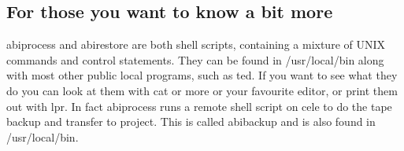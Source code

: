 \subsection{For those you want to know a bit more}

{\sf abiprocess} and {\sf abirestore} are both shell scripts,
containing a mixture of UNIX commands and control statements.  They
can be found in {\sf /usr/local/bin} along with most other public
local programs, such as {\sf ted}.  If you want to see what they do
you can look at them with {\sf cat} or {\sf more} or your favourite
editor, or print them out with {\sf lpr}.  In fact {\sf abiprocess}
runs a remote shell script on cele to do the tape backup and transfer
to project.  This is called {\sf abibackup} and is also found in {\sf
/usr/local/bin}.



